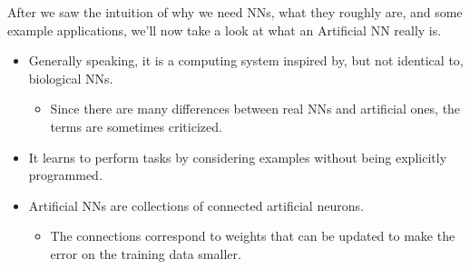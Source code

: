 After we saw the intuition of why we need NNs, what they roughly are, and some example applications, we'll now take a look at what an Artificial NN really is.
\begin{itemize}
  \item Generally speaking, it is a computing system inspired by, but not identical to, biological NNs. 
  \begin{note}
  \begin{itemize}
    \item Since there are many differences between real NNs and artificial ones, the terms are sometimes criticized.
  \end{itemize}  
  \end{note}
  \item It learns to perform tasks by considering examples without being explicitly programmed.
  \item Artificial NNs are collections of connected artificial neurons. 
  \begin{note}
    \begin{itemize}
      \item The connections correspond to weights that can be updated to make the error on the training data smaller.
    \end{itemize}  
  \end{note}
\end{itemize}

